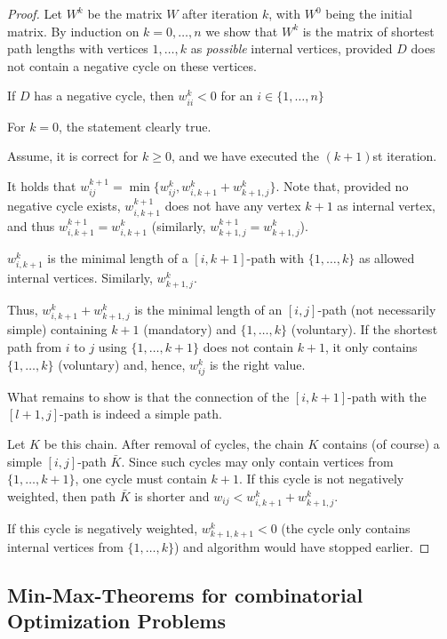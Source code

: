 \begin{proof}
\newcommand{\wii}[0]{w_{ii}}
\newcommand{\wij}[0]{w_{ij}}

Let $W^k$ be the matrix $W$ after iteration $k$, with $W^0$ being the initial matrix. By induction on $k = 0, …, n$ we show that $W^k$ is the matrix of shortest path lengths with vertices $1, …, k$ as \emph{possible} internal vertices, provided $D$ does not contain a negative cycle on these vertices.

If $D$ has a negative cycle, then $\wii^k < 0$ for an $i \in \{ 1, …, n\}$

For $k = 0$, the statement clearly true.

Assume, it is correct for $k \geq 0$, and we have executed the $(k+1)$st iteration.

It holds that $\wij^{k+1} = \min\{\wij^k, w_{i,k+1}^k + w_{k+1,j}^k\}$. Note that, provided no negative cycle exists, $w_{i,k+1}^{k+1}$ does not have any vertex $k+1$ as internal vertex, and thus $w_{i,k+1}^{k+1} = w_{i,k+1}^k$ (similarly, $w_{k+1,j}^{k+1} = w_{k+1,j}^k$).

$w_{i,k+1}^k$ is the minimal length of a $[i,k+1]$-path with $\{1, …, k\}$ as allowed internal vertices. Similarly, $w_{k+1,j}^k$.

Thus, $w_{i,k+1}^k+w_{k+1,j}^k$ is the minimal length of an $[i,j]$-path (not necessarily simple) containing $k+1$ (mandatory) and $\{ 1, …, k \}$ (voluntary). If the shortest path from $i$ to $j$ using $\{1, …, k+1\}$ does not contain $k+1$, it only contains $\{1, … , k\}$ (voluntary) and, hence, $\wij^k$ is the right value.

What remains to show is that the connection of the $[i,k+1]$-path with the $[l+1,j]$-path is indeed a simple path.

Let $K$ be this chain. After removal of cycles, the chain $K$ contains (of course) a simple $[i,j]$-path $\bar K$. Since such cycles may only contain vertices from $\{1, …, k+1\}$, one cycle must contain $k+1$.
If this cycle is not negatively weighted, then path $\bar K$ is shorter and $\wij< w_{i,k+1}^k + w_{k+1,j}^k$.

If this cycle is negatively weighted, $w_{k+1,k+1}^k<0$ (the cycle only contains internal vertices from $\{1, …, k\}$) and algorithm would have stopped earlier.
\end{proof}

\subsection*{Min-Max-Theorems for combinatorial Optimization Problems}

